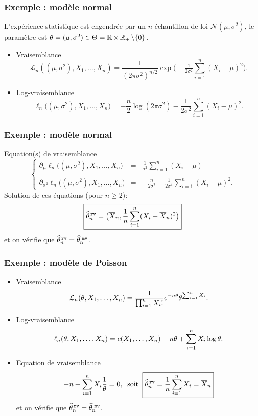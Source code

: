 \begin{frame}
\frametitle{Exemple : modèle normal } L'expérience statistique est
engendrée par un $n$-échantillon de loi ${\mathcal
N}(\mu,\sigma^2)$, le paramètre est $\theta = (\mu,\sigma^2)\in
\Theta = \operatorname{{\mathbb R}}\times \operatorname{{\mathbb R}}_+\setminus\{0\}$.
\begin{itemize}
\item
\alert{Vraisemblance} $${\mathcal L}_n((\mu,\sigma^2),
X_1,\ldots, X_n) =
\frac1{(2\pi\sigma^2)^{n/2}}\exp\big(-\tfrac{1}{2\sigma^2}
\sum_{i=1}^n(X_i-\mu)^2\big).$$
\item \alert{Log-vraisemblance}
$$\ell_n\big((\mu,\sigma^2),X_1,\ldots, X_n\big) = -\frac{n}{2}
\log(2\pi \sigma^2)-\frac{1}{2\sigma^2}\sum_{i = 1}^n (X_i-\mu)^2.$$
\end{itemize}
\end{frame}

\begin{frame}
\frametitle{Exemple : modèle normal }
\alert{Equation(s) de vraisemblance}
$$
\left\{
\begin{array}{lll}
\partial_\mu\ell_n \big((\mu,\sigma^2),X_1,\ldots, X_n\big) & = &\displaystyle\frac{1}{\sigma^2}\sum_{i = 1}^n (X_i-\mu) \\ \\
\partial_{\sigma^2}\ell_n \big((\mu,\sigma^2),X_1,\ldots, X_n\big)&
 = &\displaystyle -\frac{n}{2\sigma^2}+\frac{1}{2\sigma^4}
 \sum_{i = 1}^n (X_i-\mu)^2.
\end{array}
\right.
$$
Solution de ces \'equations (pour $n \geq 2$):
$$\boxed{\widehat
{\theta}_n^{\,{\tt rv}} = \big(\overline{X}_n,\frac{1}{n} \sum_{i =
1}^n(X_i-\overline{X}_n)^2\big)}$$ et on vérifie que $\widehat
{\theta}_n^{\,{\tt rv}} =\operatorname{\widehat \theta_n^{\,\,{\tt mv}}}$.
\end{frame}



\begin{frame}
\frametitle{Exemple : modèle de Poisson}
\begin{itemize}
\item
\alert{Vraisemblance}
$${\mathcal L}_n(\theta, X_1,\ldots, X_n) =
\frac{1}{\prod_{i = 1}^n X_i!}e^{-n\theta}\theta^{\sum_{i = 1}^n X_i}.$$
\item \alert{Log-vraisemblance}
$$\ell_n(\theta, X_1,\ldots, X_n) = c(X_1,\ldots, X_n)-n\theta +\sum_{i =1}^n X_i \log \theta.$$
\item \alert{Equation de vraisemblance}
$$-n+\sum_{i = 1}^n X_i \frac{1}{\theta} = 0,\;\;
\text{soit}\;\;
\boxed{\widehat {\theta}_n^{\,{\tt rv}} = \frac{1}{n}\sum_{i = 1}^n X_i=\overline{X}_n}$$
et on vérifie que $\widehat {\theta}_n^{\,{\tt rv}} =\operatorname{\widehat \theta_n^{\,\,{\tt mv}}}$.
\end{itemize}
\end{frame}

